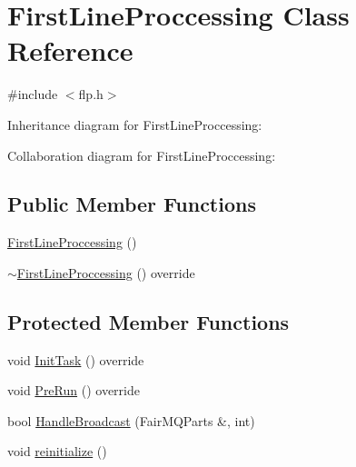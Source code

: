 \hypertarget{classFirstLineProccessing}{}\section{First\+Line\+Proccessing Class Reference}
\label{classFirstLineProccessing}


{\ttfamily \#include $<$flp.\+h$>$}



Inheritance diagram for First\+Line\+Proccessing\+:


Collaboration diagram for First\+Line\+Proccessing\+:
\subsection*{Public Member Functions}
\begin{DoxyCompactItemize}
\item 
\hyperlink{classFirstLineProccessing_a8361d63ddd360e64f21c6bbfa1c2ccc1}{First\+Line\+Proccessing} ()
\item 
\hyperlink{classFirstLineProccessing_a013769295275f7e644c4baf2ead67651}{$\sim$\+First\+Line\+Proccessing} () override
\end{DoxyCompactItemize}
\subsection*{Protected Member Functions}
\begin{DoxyCompactItemize}
\item 
void \hyperlink{classFirstLineProccessing_aadc11c5da2148b9e584fb4466f092e9f}{Init\+Task} () override
\item 
void \hyperlink{classFirstLineProccessing_aa514bbe1aeeebc117747a14469964d46}{Pre\+Run} () override
\item 
bool \hyperlink{classFirstLineProccessing_a56feb37b7dc6ad2b73ddc309dd430e84}{Handle\+Broadcast} (Fair\+M\+Q\+Parts \&, int)
\item 
void \hyperlink{classFirstLineProccessing_a13a9efcb3ab178f40c3ad371f0b87403}{reinitialize} ()
\end{DoxyCompactItemize}
